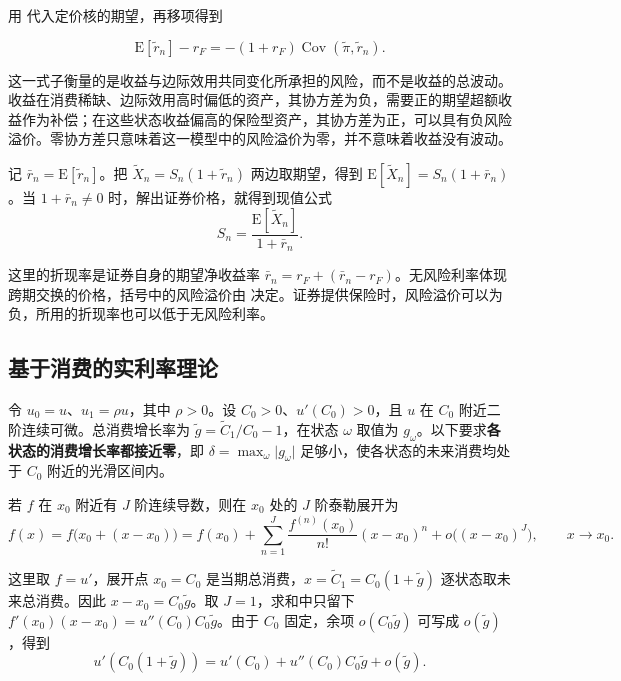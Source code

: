 用 代入定价核的期望，再移项得到
\begin{tcolorbox}[knowledge,title=精确风险溢价关系]
\begin{equation}
 \mathrm E[\tilde r_n]-r_F=-(1+r_F)\operatorname{Cov}(\widetilde\pi,\tilde r_n).
 \label{eq:wj-10-21}
\end{equation}
\end{tcolorbox}

这一式子衡量的是收益与边际效用共同变化所承担的风险，而不是收益的总波动。收益在消费稀缺、边际效用高时偏低的资产，其协方差为负，需要正的期望超额收益作为补偿；在这些状态收益偏高的保险型资产，其协方差为正，可以具有负风险溢价。零协方差只意味着这一模型中的风险溢价为零，并不意味着收益没有波动。

记 $\bar r_n=\mathrm E[\tilde r_n]$。把 $\widetilde X_n=S_n(1+\tilde r_n)$ 两边取期望，得到 $\mathrm E[\widetilde X_n]=S_n(1+\bar r_n)$。当 $1+\bar r_n\ne0$ 时，解出证券价格，就得到现值公式
\begin{equation}
 S_n=\frac{\mathrm E[\widetilde X_n]}{1+\bar r_n}.
 \label{eq:wj-10-22}
\end{equation}

这里的折现率是证券自身的期望净收益率 $\bar r_n=r_F+(\bar r_n-r_F)$。无风险利率体现跨期交换的价格，括号中的风险溢价由 决定。证券提供保险时，风险溢价可以为负，所用的折现率也可以低于无风险利率。

\subsection{基于消费的实利率理论}
令 $u_0=u$、$u_1=\rho u$，其中 $\rho>0$。设 $C_0>0$、$u'(C_0)>0$，且 $u$ 在 $C_0$ 附近二阶连续可微。总消费增长率为 $\tilde g=\widetilde C_1/C_0-1$，在状态 $\omega$ 取值为 $g_\omega$。以下要求\textbf{各状态的消费增长率都接近零}，即 $\delta=\max_\omega\lvert g_\omega\rvert$ 足够小，使各状态的未来消费均处于 $C_0$ 附近的光滑区间内。

若 $f$ 在 $x_0$ 附近有 $J$ 阶连续导数，则在 $x_0$ 处的 $J$ 阶泰勒展开为
\[
 f(x)=f\bigl(x_0+(x-x_0)\bigr)
 =f(x_0)+\sum_{n=1}^{J}\frac{f^{(n)}(x_0)}{n!}(x-x_0)^n
 +o\bigl((x-x_0)^J\bigr),\qquad x\to x_0.
\]

这里取 $f=u'$，展开点 $x_0=C_0$ 是当期总消费，$x=\widetilde C_1=C_0(1+\tilde g)$ 逐状态取未来总消费。因此 $x-x_0=C_0\tilde g$。取 $J=1$，求和中只留下 $f'(x_0)(x-x_0)=u''(C_0)C_0\tilde g$。由于 $C_0$ 固定，余项 $o(C_0\tilde g)$ 可写成 $o(\tilde g)$，得到
\[
 u'(C_0(1+\tilde g))=u'(C_0)+u''(C_0)C_0\tilde g+o(\tilde g).
\]

